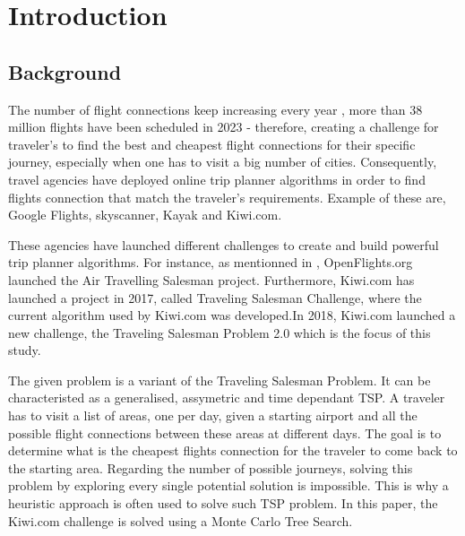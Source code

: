\chapter{Introduction}
\label{Chapter1}



\section{Background}

The number of flight connections keep increasing every year \cite{statista_flights_year}, more than 38 million flights have been scheduled in 2023 - therefore, creating a challenge for traveler's to find the best and cheapest flight connections for their specific journey, especially when one has to visit a big number of cities.
Consequently, travel agencies have deployed online trip planner algorithms in order to find flights connection that match the traveler's requirements. Example of these are, Google Flights, skyscanner, Kayak and Kiwi.com.

These agencies have launched different challenges to create and build powerful trip planner algorithms. For instance, as mentionned in \cite{reinforcement_learning_yaro}, OpenFlights.org launched the Air Travelling Salesman project. Furthermore, Kiwi.com has launched a project in 2017, called Traveling Salesman Challenge, where the current algorithm used by Kiwi.com was developed.In 2018, Kiwi.com launched a new challenge, the Traveling Salesman Problem 2.0 which is the focus of this study.

The given problem is a variant of the Traveling Salesman Problem. It can be characteristed as a generalised, assymetric and time dependant TSP.
A traveler has to visit a list of areas, one per day, given a starting airport and all the possible flight connections between these areas at different days. The goal is to determine what is the cheapest flights connection for the traveler to come back to the starting area. Regarding the number of possible journeys, solving this problem by exploring every single potential solution is impossible. This is why a heuristic approach is often used to solve such TSP problem. In this paper, the Kiwi.com challenge is solved using a Monte Carlo Tree Search.
